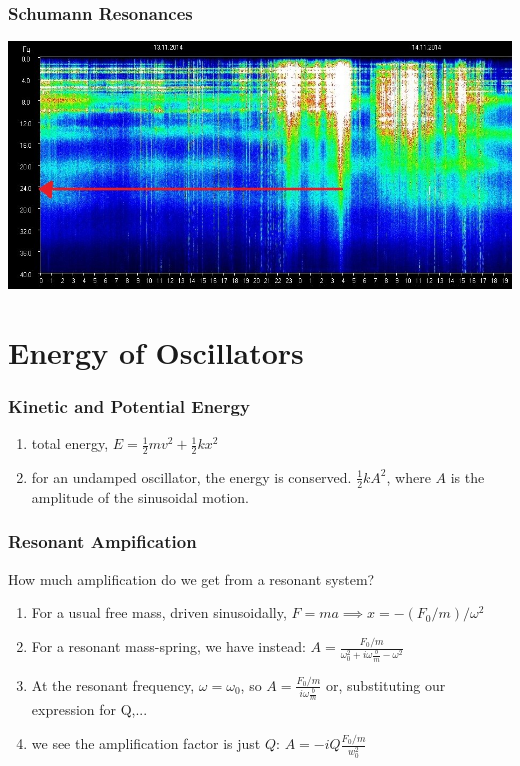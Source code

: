 \documentclass[pdf,hideothersubsections]{beamer}
\begin{document}
\begin{frame}
\frametitle{Schumann Resonances}
\includegraphics[width=\textwidth]{Schumann.jpg}
\end{frame}


\section{Energy of Oscillators}
\begin{frame}
\frametitle{Kinetic and Potential Energy}
\pause
\begin{enumerate}
\item total energy, $E =  \frac{1}{2} m v^2 + \frac{1}{2}k x^2$
\pause
\item for an undamped oscillator, the energy is
  conserved. $\frac{1}{2} k A^2$, where $A$ is the amplitude of the
  sinusoidal motion.
\end{enumerate}

\end{frame}

\begin{frame}
\frametitle{Resonant Ampification}
How much amplification do we get from a resonant system?
\pause
\begin{enumerate}
\item For a usual free mass, driven sinusoidally, $F = m a \implies x = - (F_0/m) / \omega^2$
\pause
\item For a resonant mass-spring, we have instead: $A =
  \frac{F_0/m}{\omega_0^2 + i \omega \frac{b}{m} - \omega^2}$
\pause
\item At the resonant frequency, $\omega = \omega_0$, so $A =
  \frac{F_0/m}{i \omega \frac{b}{m}}$ or, substituting our expression
  for Q,...
\pause
\item we see the amplification factor is just $Q$:  $A = -i Q \frac{F_0/m}{w_0^2}$

\end{enumerate}

\end{frame}
\end{document}
